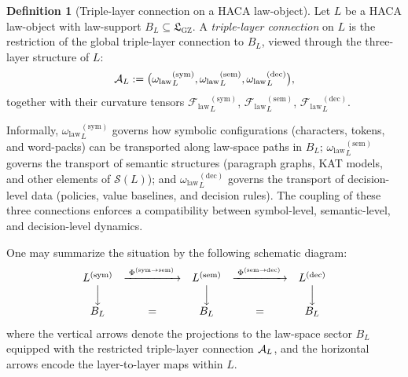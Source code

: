\documentclass[11pt]{book}
\theoremstyle{plain}
\theoremstyle{definition}
\newtheorem{definition}[theorem]{Definition}
\theoremstyle{remark}
\newcommand{\GZLS}{\ensuremath{\mathfrak{L}_{\mathrm{GZ}}}}       \newcommand{\GZLT}{\ensuremath{M_{!w}}}                           \newcommand{\GZLOC}{\ensuremath{A_M}}                             \newcommand{\GZLC}{\ensuremath{\omega_{\mathrm{law}}}}            \newcommand{\GZLCurv}{\ensuremath{\mathcal{F}_{\mathrm{law}}}}
\begin{document}
\begin{definition}[Triple-layer connection on a HACA law-object]
\label{def:haca-triple-layer-connection}
Let $L$ be a HACA law-object with law-support $B_L\subseteq\GZLS$.
A \emph{triple-layer connection} on $L$ is the restriction of the
global triple-layer connection \GZTLC to $B_L$, viewed through the
three-layer structure of $L$:
\[
  \GZTLC_L
  :=
  \bigl(
    {\GZLC}_L^{(\mathrm{sym})},
    {\GZLC}_L^{(\mathrm{sem})},
    {\GZLC}_L^{(\mathrm{dec})}
  \bigr),
\]
together with their curvature tensors
${\GZLCurv}_L^{(\mathrm{sym})}$,
${\GZLCurv}_L^{(\mathrm{sem})}$,
${\GZLCurv}_L^{(\mathrm{dec})}$.
\end{definition}

Informally, ${\GZLC}_L^{(\mathrm{sym})}$ governs how symbolic
configurations (characters, tokens, and word-packs) can be transported
along law-space paths in $B_L$; ${\GZLC}_L^{(\mathrm{sem})}$ governs the
transport of semantic structures (paragraph graphs, KAT models, and
other elements of $\mathcal{S}(L)$); and ${\GZLC}_L^{(\mathrm{dec})}$
governs the transport of decision-level data (policies, value
baselines, and decision rules). The coupling of these three connections
enforces a compatibility between symbol-level, semantic-level, and
decision-level dynamics.

One may summarize the situation by the following schematic diagram:
\[
\begin{array}{ccccc}
  L^{(\mathrm{sym})} & \xrightarrow{\;\Phi^{(\mathrm{sym}\to\mathrm{sem})}\;}
                     & L^{(\mathrm{sem})} & \xrightarrow{\;\Phi^{(\mathrm{sem}\to\mathrm{dec})}\;}
                     & L^{(\mathrm{dec})} \\
  \Big\downarrow &   & \Big\downarrow &   & \Big\downarrow \\
  B_L            & = & B_L            & = & B_L
\end{array}
\]
where the vertical arrows denote the projections to the law-space
sector $B_L$ equipped with the restricted triple-layer connection
$\mathcal{A}_L$, and the horizontal arrows encode the layer-to-layer maps
within $L$.
\end{document}

